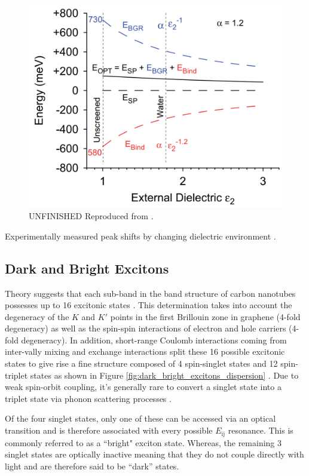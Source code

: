 \begin{figure}
	\centering
	\includegraphics[scale=0.25]{images/chapter_optical_props/dielectric_binding_walsh_2007}
	\caption{ {\color{red} UNFINISHED} Reproduced from \cite{walsh2008scaling}.}
\end{figure}

Experimentally measured peak shifts by changing dielectric environment \cite{ohno2007excitonic}.

\subsection{Dark and Bright Excitons}

Theory suggests that each sub-band in the band structure of carbon nanotubes possesses up to 16 excitonic states \cite{amori2018excitons}. This determination takes into account the degeneracy of the $K$ and $K'$ points in the first Brillouin zone in graphene (4-fold degeneracy) as well as the spin-spin interactions of electron and hole carriers (4-fold degeneracy). In addition, short-range Coulomb interactions coming from inter-vally mixing and exchange interactions split these 16 possible excitonic states to give rise a fine structure composed of 4 spin-singlet states and 12 spin-triplet states as shown in Figure \ref{fig:dark_bright_excitons_dispersion} \cite{ando2006effects}. Due to weak spin-orbit coupling, it's generally rare to convert a singlet state into a triplet state via phonon scattering processes \cite{amori2018excitons}.

Of the four singlet states, only one of these can be accessed via an optical transition and is therefore associated with every possible $E_\text{ij}$ resonance. This is commonly referred to as a ``bright" exciton state. Whereas, the remaining 3 singlet states are optically inactive meaning that they do not couple directly with light and are therefore said to be ``dark'' states.

